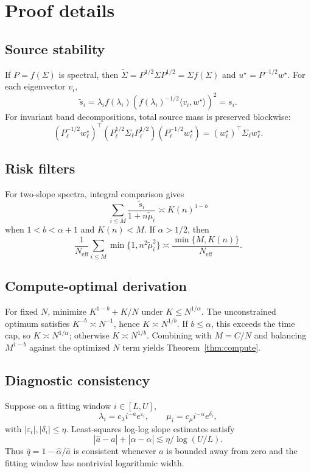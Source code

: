 \documentclass{article}
\newcommand{\tSig}{\widetilde\Sigma}
\newcommand{\tmu}{\widetilde\mu}
\newcommand{\ts}{\widetilde s}
\newcommand{\Neff}{N_{\mathrm{eff}}}
\begin{document}
\appendix
\section{Proof details}
\subsection{Source stability}\label{app:source}
If $P=f(\Sigma)$ is spectral, then $\tSig=P^{1/2}\Sigma P^{1/2}=\Sigma f(\Sigma)$ and $u^\star=P^{-1/2}w^\star$.  For each eigenvector $v_i$,
\[
    \ts_i=\lambda_i f(\lambda_i)\left(f(\lambda_i)^{-1/2}\langle v_i,w^\star\rangle\right)^2=s_i.
\]
For invariant band decompositions, total source mass is preserved blockwise:
\[
    (P_\ell^{-1/2}w^\star_\ell)^\top(P_\ell^{1/2}\Sigma_\ell P_\ell^{1/2})(P_\ell^{-1/2}w^\star_\ell)=(w^\star_\ell)^\top\Sigma_\ell w^\star_\ell.
\]

\subsection{Risk filters}
For two-slope spectra, integral comparison gives
\[
    \sum_{i\le M}\frac{\ts_i}{1+n\tmu_i}\asymp K(n)^{1-b}
\]
when $1<b<\alpha+1$ and $K(n)<M$.  If $\alpha>1/2$, then
\[
    \frac1{\Neff}\sum_{i\le M}\min\{1,n^2\tmu_i^2\}\asymp\frac{\min\{M,K(n)\}}{\Neff}.
\]

\subsection{Compute-optimal derivation}
For fixed $N$, minimize $K^{1-b}+K/N$ under $K\le N^{1/\alpha}$.  The unconstrained optimum satisfies $K^{-b}\asymp N^{-1}$, hence $K\asymp N^{1/b}$.  If $b\le\alpha$, this exceeds the time cap, so $K\asymp N^{1/\alpha}$; otherwise $K\asymp N^{1/b}$.  Combining with $M=C/N$ and balancing $M^{1-b}$ against the optimized $N$ term yields Theorem~\ref{thm:compute}.

\subsection{Diagnostic consistency}
Suppose on a fitting window $i\in[L,U]$,
\[
    \lambda_i=c_\lambda i^{-a}e^{\varepsilon_i},\qquad
    \mu_i=c_\mu i^{-\alpha}e^{\delta_i},
\]
with $|\varepsilon_i|,|\delta_i|\le\eta$.  Least-squares log-log slope estimates satisfy
\[
    |\widehat a-a|+|\widehat\alpha-\alpha|\lesssim\eta/\log(U/L).
\]
Thus $\widehat q=1-\widehat\alpha/\widehat a$ is consistent whenever $a$ is bounded away from zero and the fitting window has nontrivial logarithmic width.
\end{document}
